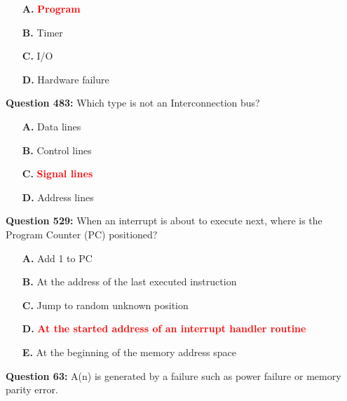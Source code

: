 \documentclass[12pt,a4paper]{article}
\begin{document}
\begin{itemize}
    \item[\textbf{A.}] \textcolor{red}{\textbf{Program}}
    \item[\textbf{B.}] Timer
    \item[\textbf{C.}] I/O
    \item[\textbf{D.}] Hardware failure
\end{itemize}

\vspace{0.5cm}

\vspace{0.5cm}

\textbf{Question 483:} Which type is not an Interconnection bus?

\begin{itemize}
    \item[\textbf{A.}] Data lines
    \item[\textbf{B.}] Control lines
    \item[\textbf{C.}] \textcolor{red}{\textbf{Signal lines}}
    \item[\textbf{D.}] Address lines
\end{itemize}

\vspace{0.5cm}

\vspace{0.5cm}

\textbf{Question 529:} When an interrupt is about to execute next, where is the Program Counter (PC) positioned?

\begin{itemize}
    \item[\textbf{A.}] Add 1 to PC
    \item[\textbf{B.}] At the address of the last executed instruction
    \item[\textbf{C.}] Jump to random unknown position
    \item[\textbf{D.}] \textcolor{red}{\textbf{At the started address of an interrupt handler routine}}
    \item[\textbf{E.}] At the beginning of the memory address space
\end{itemize}

\vspace{0.5cm}

\vspace{0.5cm}

\textbf{Question 63:} A(n) \underline{\hspace{1.5cm}} is generated by a failure such as power failure or memory parity error.
\end{document}
